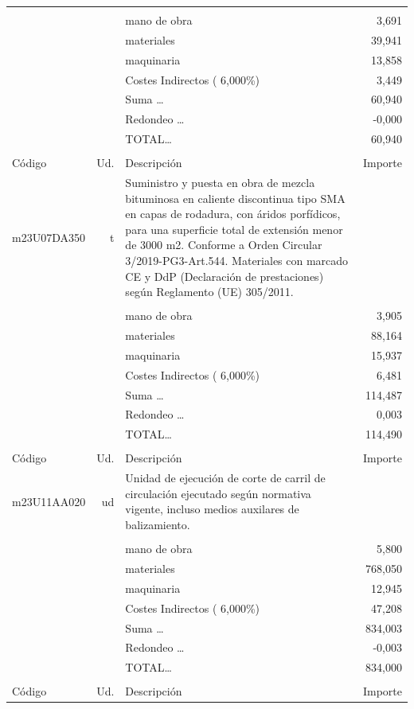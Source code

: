 \documentclass{book}%
\begin{document}
\begin{supertabular}{l r p{60mm} r}
&&&\\%
&&mano de obra&     3,691\\%
&&materiales&    39,941\\%
&&maquinaria&    13,858\\%
&&Costes Indirectos (     6,000\%)&     3,449\\%
&&Suma \ldots&    60,940\\%
&&Redondeo \ldots&    {-}0,000\\%
%
&&TOTAL\ldots&    60,940\\%
&&&\\%
Código&Ud.&Descripción&Importe\\%
\hline%
m23U07DA350&t&Suministro y puesta en obra de mezcla bituminosa en caliente discontinua tipo SMA en capas de rodadura, con áridos porfídicos, para una superficie total de extensión menor de 3000 m2. Conforme a Orden Circular 3/2019{-}PG3{-}Art.544. Materiales con marcado CE y DdP (Declaración de prestaciones) según Reglamento (UE) 305/2011.&\\%
&&&\\%
&&mano de obra&     3,905\\%
&&materiales&    88,164\\%
&&maquinaria&    15,937\\%
&&Costes Indirectos (     6,000\%)&     6,481\\%
&&Suma \ldots&   114,487\\%
&&Redondeo \ldots&     0,003\\%
%
&&TOTAL\ldots&   114,490\\%
&&&\\%
Código&Ud.&Descripción&Importe\\%
\hline%
m23U11AA020&ud&Unidad de ejecución de corte de carril de circulación ejecutado según normativa vigente, incluso medios auxilares de balizamiento.&\\%
&&&\\%
&&mano de obra&     5,800\\%
&&materiales&   768,050\\%
&&maquinaria&    12,945\\%
&&Costes Indirectos (     6,000\%)&    47,208\\%
&&Suma \ldots&   834,003\\%
&&Redondeo \ldots&    {-}0,003\\%
%
&&TOTAL\ldots&   834,000\\%
&&&\\%
Código&Ud.&Descripción&Importe\\%

\end{supertabular}
\end{document}
